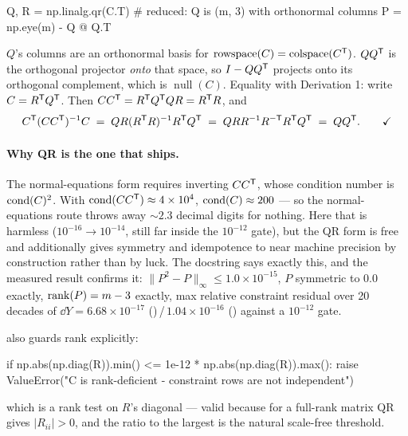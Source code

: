 \begin{srclisting}
Q, R = np.linalg.qr(C.T)      # reduced: Q is (m, 3) with orthonormal columns
P = np.eye(m) - Q @ Q.T
\end{srclisting}

$Q$'s columns are an orthonormal basis for
$\mathrm{rowspace}(C) = \mathrm{colspace}(C^{\mathsf{T}})$. $QQ^{\mathsf{T}}$ is the orthogonal
projector \emph{onto} that space, so $I - QQ^{\mathsf{T}}$ projects onto its orthogonal
complement, which is $\operatorname{null}(C)$. Equality with Derivation 1: write
$C = R^{\mathsf{T}} Q^{\mathsf{T}}$. Then $CC^{\mathsf{T}} = R^{\mathsf{T}} Q^{\mathsf{T}} QR = R^{\mathsf{T}} R$, and
%
\begin{equation}
C^{\mathsf{T}}(CC^{\mathsf{T}})^{-1}C \;=\; QR(R^{\mathsf{T}} R)^{-1}R^{\mathsf{T}} Q^{\mathsf{T}}
\;=\; QRR^{-1}R^{-\mathsf{T}}R^{\mathsf{T}} Q^{\mathsf{T}} \;=\; QQ^{\mathsf{T}}. \qquad\checkmark
\label{eq:qrequiv}
\end{equation}

\paragraph{Why QR is the one that ships.} The normal-equations form requires
inverting $CC^{\mathsf{T}}$, whose condition number is $\operatorname{cond}(C)^2$. With
$\operatorname{cond}(CC^{\mathsf{T}}) \approx 4\times10^{4}$, $\operatorname{cond}(C) \approx 200$ --- so the
normal-equations route throws away ${\sim}2.3$ decimal digits for nothing. Here
that is harmless ($10^{-16} \to 10^{-14}$, still far inside the $10^{-12}$
gate), but the QR form is free and additionally gives symmetry and idempotence
to near machine precision by construction rather than by luck. The docstring
says exactly this, and the measured result confirms it:
$\|P^2 - P\|_\infty \le 1.0\times10^{-15}$, $P$ symmetric to 0.0 exactly,
$\operatorname{rank}(P) = m - 3$ exactly, max relative constraint residual over 20 decades of
$\dd Y = 6.68\times10^{-17}$ ()\,/\,$1.04\times10^{-16}$ ()
against a $10^{-12}$ gate. 

 also guards rank explicitly:

\begin{srclisting}
if np.abs(np.diag(R)).min() <= 1e-12 * np.abs(np.diag(R)).max():
    raise ValueError("C is rank-deficient - constraint rows are not independent")
\end{srclisting}

which is a rank test on $R$'s diagonal --- valid because for a full-rank matrix
QR gives $|R_{ii}| > 0$, and the ratio to the largest is the natural scale-free
threshold.

